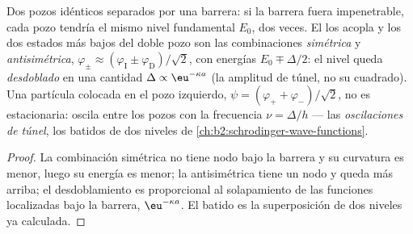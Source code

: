 \begin{proposition}\label{prop:b2:potential-wells-tunneling:double}
Dos pozos idénticos separados por una barrera: si la barrera fuera
impenetrable, cada pozo tendría el mismo nivel fundamental $E_0$, dos veces.
El  los acopla y los dos estados más bajos del doble pozo
son las combinaciones \emph{simétrica} y \emph{antisimétrica},
$\varphi_\pm \approx (\varphi_{\text{I}} \pm \varphi_{\text{D}})/\sqrt2$, con energías
$E_0 \mp \Delta/2$: el nivel queda \emph{desdoblado} en una cantidad $\Delta \propto
\eu^{-\kappa a}$ (la amplitud de túnel, no su cuadrado). Una partícula
colocada en el pozo izquierdo, $\psi = (\varphi_+ + \varphi_-)/\sqrt2$, no es
estacionaria: oscila entre los pozos con la frecuencia
$\nu = \Delta/h$ --- las \emph{oscilaciones de túnel}, los batidos de dos niveles de
\cref{ch:b2:schrodinger-wave-functions}.
\end{proposition}

\begin{proof}
La combinación simétrica no tiene nodo bajo la barrera y su curvatura es
menor, luego su energía es menor; la antisimétrica tiene un nodo y
queda más arriba; el desdoblamiento es proporcional al solapamiento de las funciones
localizadas bajo la barrera, $\eu^{-\kappa a}$. El batido es
la superposición de dos niveles ya calculada.
\end{proof}

